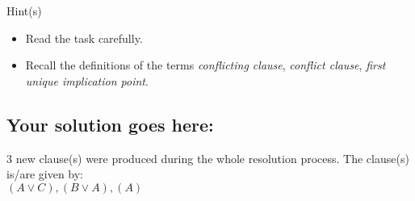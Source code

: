 \documentclass[a4paper,11pt,fleqn]{article}
\begin{document}
\begin{mybclogo}{Hint(s)}
\begin{itemize}
\item Read the task carefully.
\item Recall the definitions of the terms \textit{conflicting clause}, \textit{conflict clause}, \textit{first unique implication point}.
\end{itemize}
\end{mybclogo}

\subsection*{Your solution goes here:}
    3 new clause(s) were produced during the whole resolution process. The clause(s) is/are given by: \\ $( A \vee  C), ( B \vee  A), ( A)$
   
\end{document}
